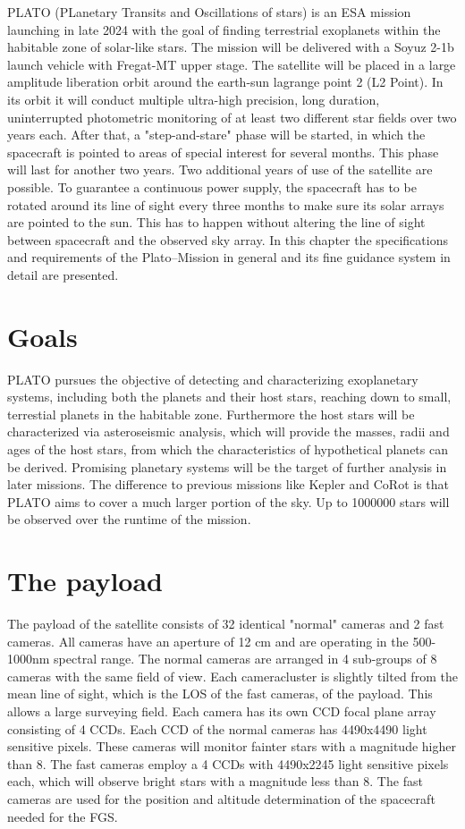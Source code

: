 PLATO (PLanetary Transits and Oscillations of stars) is an ESA mission launching in late 2024 with the goal of finding terrestrial exoplanets within the habitable zone of solar-like stars. The mission will be delivered with a Soyuz 2-1b launch vehicle with Fregat-MT upper stage. The satellite will be placed in a large amplitude liberation orbit around the earth-sun lagrange point 2 (L2 Point). In its orbit it will conduct multiple ultra-high precision, long duration, uninterrupted photometric monitoring of at least two different star fields over two years each. After that, a "step-and-stare" phase will be started, in which the spacecraft is pointed to areas of special interest for several months. This phase will last for another two years. Two additional years of use of the satellite are possible. To guarantee a continuous power supply, the spacecraft has to be rotated around its line of sight every three months to make sure its solar arrays are pointed to the sun. This has to happen without altering the line of sight between spacecraft and the observed sky array.
\newline
In this chapter the specifications and requirements of the Plato--Mission in general and its fine guidance system in detail are presented.
\section{Goals}
PLATO pursues the objective of detecting and characterizing exoplanetary systems, including both the planets and their host stars, reaching down to small, terrestial planets in the habitable zone. Furthermore the host stars will be characterized via asteroseismic analysis, which will provide the masses, radii and ages of the host stars, from which the characteristics of hypothetical planets can be derived. Promising planetary systems will be the target of further analysis in later missions. The difference to previous missions like Kepler and CoRot is that PLATO aims to cover a much larger portion of the sky. Up to 1000000 stars will be observed over the runtime of the mission. 
\section{The payload}
The payload of the satellite consists of 32 identical "normal" cameras and 2 fast cameras. All cameras have an aperture of 12 cm and are operating  in the 500-1000nm spectral range. The normal cameras are arranged in 4 sub-groups of 8 cameras with the same field of view. Each cameracluster is slightly tilted from the mean line of sight, which is the LOS of the fast cameras, of the payload. This allows a large surveying field.
\newline
Each camera has its own CCD focal plane array consisting of 4 CCDs. Each CCD of the normal cameras has 4490x4490 light sensitive pixels. These cameras will monitor fainter stars with a magnitude higher than 8. The fast cameras employ a 4 CCDs with 4490x2245 light sensitive pixels each, which will observe bright stars with a magnitude less than 8. The fast cameras are used for the position and altitude determination of the spacecraft needed for the FGS.   

